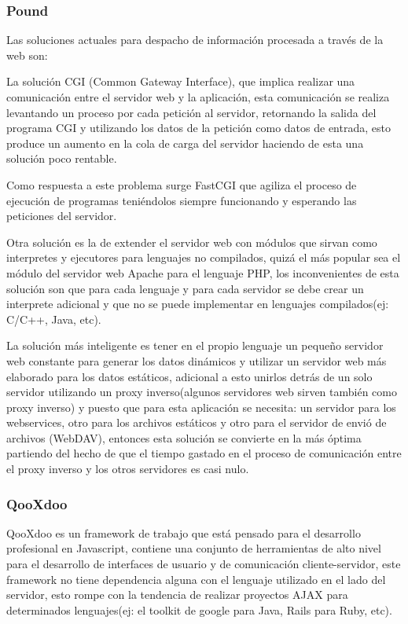 \subsubsection*{Pound \cite{pound} }
\label{tec:pound}

Las soluciones actuales para despacho de información procesada a través de la web son:

La solución CGI (Common Gateway Interface), que implica realizar una comunicación entre el servidor web y la aplicación, esta comunicación se realiza levantando un proceso por cada petición al servidor, retornando la salida del programa CGI y utilizando los datos de la petición como datos de entrada, esto produce un aumento en la cola de carga del servidor haciendo de esta una solución poco rentable.

Como respuesta a este problema surge FastCGI que agiliza el proceso de ejecución de programas teniéndolos siempre funcionando y esperando las peticiones del servidor.

Otra solución es la de extender el servidor web con módulos que sirvan como interpretes y ejecutores para lenguajes no compilados, quizá el más popular sea el módulo del servidor web Apache para el lenguaje PHP, los inconvenientes de esta solución son que para cada lenguaje y para cada servidor se debe crear un interprete adicional y que no se puede implementar en lenguajes compilados(ej: C/C++, Java, etc).

La solución más inteligente es tener en el propio lenguaje un pequeño servidor web constante para generar los datos dinámicos y utilizar un servidor web más elaborado para los datos estáticos, adicional a esto unirlos detrás de un solo servidor utilizando un proxy inverso(algunos servidores web sirven también como proxy inverso) y puesto que para esta aplicación se necesita: un servidor para los webservices, otro para los archivos estáticos y otro para el servidor de envió de archivos (WebDAV), entonces esta solución se convierte en la más óptima partiendo del hecho de que el tiempo gastado en el proceso de comunicación entre el proxy inverso y los otros servidores es casi nulo.


\subsubsection*{QooXdoo \cite{qooxdoo} }
\label{tec:qooxdoo}

QooXdoo es un framework de trabajo que está pensado para el desarrollo profesional en Javascript, contiene una conjunto de herramientas de alto nivel para el desarrollo de interfaces de usuario y de comunicación cliente-servidor, este framework no tiene dependencia alguna con el lenguaje utilizado en el lado del servidor, esto rompe con la tendencia de realizar proyectos AJAX para determinados lenguajes(ej: el toolkit de google para Java, Rails para Ruby, etc).

